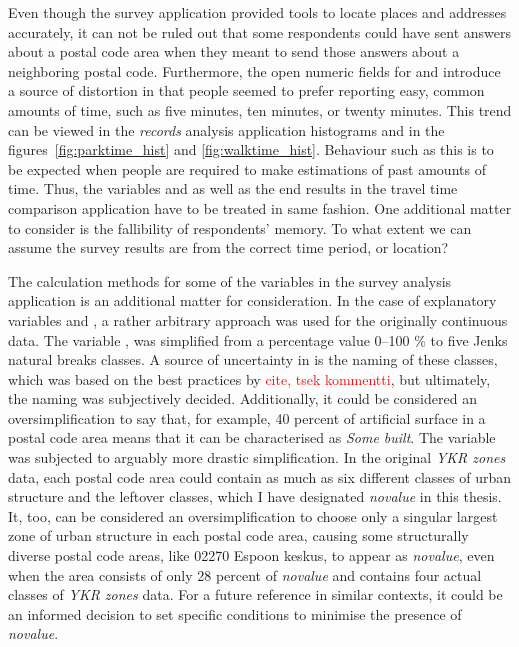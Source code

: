 Even though the survey application provided tools to locate places and addresses accurately, it can not be ruled out that some respondents could have sent answers about a postal code area when they meant to send those answers about a neighboring postal code. Furthermore, the open numeric fields for  and  introduce a source of distortion in that people seemed to prefer reporting easy, common amounts of time, such as five minutes, ten minutes, or twenty minutes. This trend can be viewed in the \textit{records} analysis application histograms and in the figures~\ref{fig:parktime_hist} and \ref{fig:walktime_hist}. Behaviour such as this is to be expected when people are required to make estimations of past amounts of time. Thus, the variables  and  as well as the end results in the travel time comparison application have to be treated in same fashion. One additional matter to consider is the fallibility of respondents' memory. To what extent we can assume the survey results are from the correct time period, or location?

The calculation methods for some of the variables in the survey analysis application is an additional matter for consideration. In the case of explanatory variables  and , a rather arbitrary approach was used for the originally continuous data. The variable , was simplified from a percentage value 0--100 \% to five Jenks natural breaks classes. A source of uncertainty in  is the naming of these classes, which was based on the best practices by \textcolor{red}{cite, tsek kommentti}, but ultimately, the naming was subjectively decided. Additionally, it could be considered an oversimplification to say that, for example, 40 percent of artificial surface in a postal code area means that it can be characterised as \textit{Some built}. The variable  was subjected to arguably more drastic simplification. In the original \textit{YKR zones} data, each postal code area could contain as much as six different classes of urban structure and the leftover classes, which I have designated \textit{novalue} in this thesis. It, too, can be considered an oversimplification to choose only a singular largest zone of urban structure in each postal code area, causing some structurally diverse postal code areas, like 02270 Espoon keskus, to appear as \textit{novalue}, even when the area consists of only 28 percent of \textit{novalue} and contains four actual classes of \textit{YKR zones} data. For a future reference in similar contexts, it could be an informed decision to set specific conditions to minimise the presence of \textit{novalue}.

